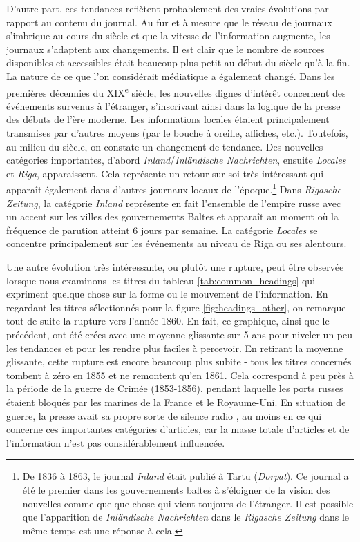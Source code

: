 \documentclass[a4paper,twoside,12pt]{article}
\begin{document}
D'autre part, ces tendances reflètent probablement des vraies évolutions par rapport au contenu du journal. Au fur et à mesure que le réseau de journaux s'imbrique au cours du siècle et que la vitesse de l'information augmente, les journaux s'adaptent aux changements. Il est clair que le nombre de sources disponibles et accessibles était beaucoup plus petit au début du siècle qu'à la fin. La nature de ce que l'on considérait \og médiatique \fg{} a également changé. Dans les premières décennies du XIX\textsuperscript{e} siècle, les nouvelles dignes d'intérêt concernent des événements survenus à l'étranger, s'inscrivant ainsi dans la logique de la presse des débuts de l'ère moderne. Les informations locales étaient principalement transmises par d'autres moyens (par le bouche à oreille, affiches, etc.). Toutefois, au milieu du siècle, on constate un changement de tendance. Des nouvelles catégories importantes, d'abord \textit{Inland}/\textit{Inländische Nachrichten}, ensuite \textit{Locales} et \textit{Riga}, apparaissent. Cela représente un \og retour sur soi \fg{} très intéressant qui apparaît également dans d'autres journaux locaux de l'époque.\footnote{De 1836 à 1863, le journal \textit{Inland} était publié à Tartu (\textit{Dorpat}). Ce journal a été le premier dans les gouvernements baltes à s'éloigner de la vision des nouvelles comme quelque chose qui vient toujours de l'étranger. Il est possible que l'apparition de \textit{Inländische Nachrichten} dans le \textit{Rigasche Zeitung} dans le même temps est une réponse à cela.} Dans \textit{Rigasche Zeitung}, la catégorie \textit{Inland} représente en fait l'ensemble de l'empire russe avec un accent sur les villes des gouvernements Baltes et apparaît au moment où la fréquence de parution atteint 6 jours par semaine. La catégorie \textit{Locales} se concentre principalement sur les événements au niveau de Riga ou ses alentours.

Une autre évolution très intéressante, ou plutôt une rupture, peut être observée lorsque nous examinons les titres du tableau \ref{tab:common_headings} qui expriment quelque chose sur la forme ou le mouvement de l'information. En regardant les titres sélectionnés pour la figure \ref{fig:headings_other}, on remarque tout de suite la rupture vers l'année 1860. En fait, ce graphique, ainsi que le précédent, ont été crées avec une moyenne glissante sur 5 ans pour niveler un peu les tendances et pour les rendre plus faciles à percevoir. En retirant la moyenne glissante, cette rupture est encore beaucoup plus subite - tous les titres concernés tombent à zéro en 1855 et ne remontent qu'en 1861. Cela correspond à peu près à la période de la guerre de Crimée (1853-1856), pendant laquelle les ports russes étaient bloqués par les marines de la France et le Royaume-Uni. En situation de guerre, la presse avait sa propre sorte de \og silence radio \fg{}, au moins en ce qui concerne ces importantes catégories d'articles, car la masse totale d'articles et de l'information n'est pas considérablement influencée.
\end{document}
